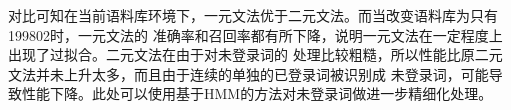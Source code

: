 对比可知在当前语料库环境下，一元文法优于二元文法。而当改变语料库为只有199802时，一元文法的
准确率和召回率都有所下降，说明一元文法在一定程度上出现了过拟合。二元文法在由于对未登录词的
处理比较粗糙，所以性能比原二元文法并未上升太多，而且由于连续的单独的已登录词被识别成
未登录词，可能导致性能下降。此处可以使用基于HMM的方法对未登录词做进一步精细化处理。
